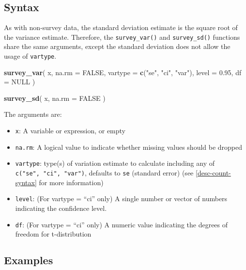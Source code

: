 \documentclass[
]{krantz}
\makeatletter
\newenvironment{Shaded}{\begin{snugshade}}{\end{snugshade}}
\newcommand{\AttributeTok}[1]{\textcolor[rgb]{0.27,0.27,0.27}{#1}}
\newcommand{\ConstantTok}[1]{\textcolor[rgb]{0.37,0.37,0.37}{#1}}
\newcommand{\FloatTok}[1]{\textcolor[rgb]{0.06,0.06,0.06}{#1}}
\newcommand{\FunctionTok}[1]{\textcolor[rgb]{0.27,0.27,0.27}{\textbf{#1}}}
\newcommand{\NormalTok}[1]{#1}
\newcommand{\StringTok}[1]{\textcolor[rgb]{0.5,0.5,0.5}{#1}}
\providecommand{\tightlist}{%
  \setlength{\itemsep}{0pt}\setlength{\parskip}{0pt}}
\newenvironment{kframe}{%
\medskip{}
\setlength{\fboxsep}{.8em}
 \def\at@end@of@kframe{}%
 \ifinner\ifhmode%
  \def\at@end@of@kframe{\end{minipage}}%
  \begin{minipage}{\columnwidth}%
 \fi\fi%
 \def\FrameCommand##1{\hskip\@totalleftmargin \hskip-\fboxsep
 \colorbox{shadecolor}{##1}\hskip-\fboxsep
     \hskip-\linewidth \hskip-\@totalleftmargin \hskip\columnwidth}%
 \MakeFramed {\advance\hsize-\width
   \@totalleftmargin\z@ \linewidth\hsize
   \@setminipage}}%
 {\par\unskip\endMakeFramed%
 \at@end@of@kframe}
\renewenvironment{Shaded}{\begin{kframe}}{\end{kframe}}
\makeatother
\begin{document}
\hypertarget{syntax-4}{%
\subsection{Syntax}\label{syntax-4}}

As with non-survey data, the standard deviation estimate is the square root of the variance estimate. Therefore, the \texttt{survey\_var()} and \texttt{survey\_sd()} functions share the same arguments, except the standard deviation does not allow the usage of \texttt{vartype}.

\begin{Shaded}
\begin{Highlighting}[]
\FunctionTok{survey\_var}\NormalTok{(}
\NormalTok{  x,}
  \AttributeTok{na.rm =} \ConstantTok{FALSE}\NormalTok{,}
  \AttributeTok{vartype =} \FunctionTok{c}\NormalTok{(}\StringTok{"se"}\NormalTok{, }\StringTok{"ci"}\NormalTok{, }\StringTok{"var"}\NormalTok{),}
  \AttributeTok{level =} \FloatTok{0.95}\NormalTok{,}
  \AttributeTok{df =} \ConstantTok{NULL}
\NormalTok{)}

\FunctionTok{survey\_sd}\NormalTok{(}
\NormalTok{  x, }
  \AttributeTok{na.rm =} \ConstantTok{FALSE}
\NormalTok{)}
\end{Highlighting}
\end{Shaded}

The arguments are:

\begin{itemize}
\tightlist
\item
  \texttt{x}: A variable or expression, or empty
\item
  \texttt{na.rm}: A logical value to indicate whether missing values should be dropped
\item
  \texttt{vartype}: type(s) of variation estimate to calculate including any of \texttt{c("se",\ "ci",\ "var")}, defaults to \texttt{se} (standard error) (see \ref{desc-count-syntax} for more information)
\item
  \texttt{level}: (For vartype = ``ci'' only) A single number or vector of numbers indicating the confidence level.
\item
  \texttt{df}: (For vartype = ``ci'' only) A numeric value indicating the degrees of freedom for t-distribution
\end{itemize}

\hypertarget{examples-6}{%
\subsection{Examples}\label{examples-6}}
\end{document}
